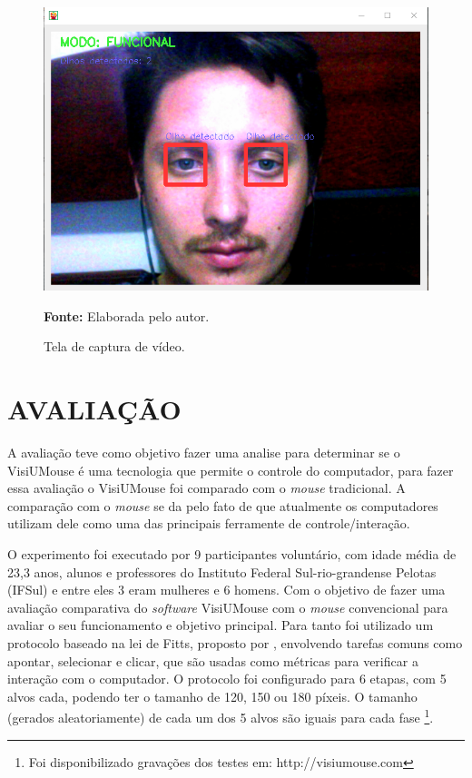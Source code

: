 \begin{figure}[H]
\caption{Tela de captura de vídeo.} 
\centering \includegraphics[scale=.45]{img/visiumouse-tela-captura-video.png}

{\fontsize{11}{11}\selectfont \textbf{Fonte:} Elaborada pelo autor.}
\label{fig:visiumouse-tela-captura-video}
\end{figure}

\chapter{AVALIAÇÃO}\label{CAP7}
A avaliação teve como objetivo fazer uma analise para determinar se o VisiUMouse é uma tecnologia que permite o controle do computador, para fazer essa avaliação o VisiUMouse foi comparado com o \textit{mouse} tradicional. A comparação com o \textit{mouse} se da pelo fato de que atualmente os computadores utilizam dele como uma das principais ferramente de controle/interação.

O experimento foi executado por 9 participantes voluntário, com idade média de 23,3 anos, alunos e professores do Instituto Federal Sul-rio-grandense Pelotas (IFSul) e entre eles 3 eram mulheres e 6 homens. Com o objetivo de fazer uma avaliação comparativa do \textit{software} VisiUMouse com o \textit{mouse} convencional para avaliar o seu funcionamento e objetivo principal. Para tanto foi utilizado um protocolo baseado na lei de Fitts, proposto por , envolvendo tarefas comuns como apontar, selecionar e clicar, que são usadas como métricas para verificar a interação com o computador. O protocolo foi configurado para 6 etapas, com 5 alvos cada, podendo ter o tamanho de 120, 150 ou 180 píxeis. O tamanho (gerados aleatoriamente) de cada um dos 5 alvos são iguais para cada fase \footnote{Foi disponibilizado gravações dos testes em: http://visiumouse.com}.

